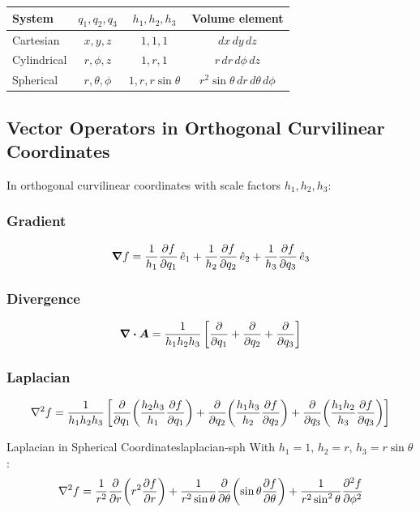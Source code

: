 \documentclass[11pt, letterpaper]{article}
\theoremstyle{plain}
\newcommand{\vv}[1]{\bm{#1}}
\begin{document}
\begin{center}
\begin{tabular}{lccc}
    \toprule
    System & $q_1, q_2, q_3$ & $h_1, h_2, h_3$ & Volume element \\
    \midrule
    Cartesian   & $x,y,z$          & $1,1,1$          & $dx\,dy\,dz$ \\[4pt]
    Cylindrical & $r,\phi,z$       & $1,r,1$          & $r\,dr\,d\phi\,dz$ \\[4pt]
    Spherical   & $r,\theta,\phi$  & $1,r,r\sin\theta$& $r^2\sin\theta\,dr\,d\theta\,d\phi$ \\
    \bottomrule
\end{tabular}
\end{center}


\subsection{Vector Operators in Orthogonal Curvilinear Coordinates}

In orthogonal curvilinear coordinates with scale factors $h_1, h_2, h_3$:

\subsubsection*{Gradient}
\[
    \grad f = \frac{1}{h_1}\pdv{f}{q_1}\,\hat{e}_1
            + \frac{1}{h_2}\pdv{f}{q_2}\,\hat{e}_2
            + \frac{1}{h_3}\pdv{f}{q_3}\,\hat{e}_3
\]

\subsubsection*{Divergence}
\[
    \div\vv{A} = \frac{1}{h_1 h_2 h_3}\left[
        \pdv{}{q_1}(h_2 h_3 A_1) +
        \pdv{}{q_2}(h_1 h_3 A_2) +
        \pdv{}{q_3}(h_1 h_2 A_3)
    \right]
\]

\subsubsection*{Laplacian}
\[
    \nabla^2 f = \frac{1}{h_1 h_2 h_3}\left[
        \pdv{}{q_1}\!\left(\frac{h_2 h_3}{h_1}\pdv{f}{q_1}\right) +
        \pdv{}{q_2}\!\left(\frac{h_1 h_3}{h_2}\pdv{f}{q_2}\right) +
        \pdv{}{q_3}\!\left(\frac{h_1 h_2}{h_3}\pdv{f}{q_3}\right)
    \right]
\]

\begin{example}{Laplacian in Spherical Coordinates}{laplacian-sph}
    With $h_1 = 1$, $h_2 = r$, $h_3 = r\sin\theta$:
    \[
        \nabla^2 f = \frac{1}{r^2}\pdv{}{r}\!\left(r^2\pdv{f}{r}\right)
                   + \frac{1}{r^2\sin\theta}\pdv{}{\theta}\!\left(\sin\theta\pdv{f}{\theta}\right)
                   + \frac{1}{r^2\sin^2\theta}\pdv[2]{f}{\phi}
    \]
\end{example}
\end{document}
